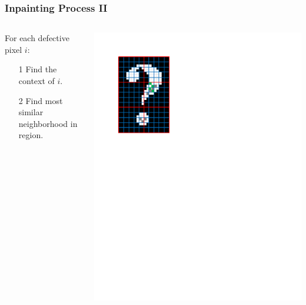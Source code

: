 \documentclass{beamer}
\begin{document}
\begin{frame}
\frametitle{Inpainting Process II}
\begin{columns}
\begin{column}{0.5\textwidth}
For each defective pixel $i$:
\begin{enumerate}
\item[1] Find the context of $i$.
\item[2] Find most similar neighborhood in region.
\end{enumerate}
\end{column}
\begin{column}{0.5\textwidth}
\includegraphics[width=1\textwidth,trim={0 6.5in 4in 0},clip]{context_and_match}
\end{column}
\end{columns}
\end{frame}
\end{document}
